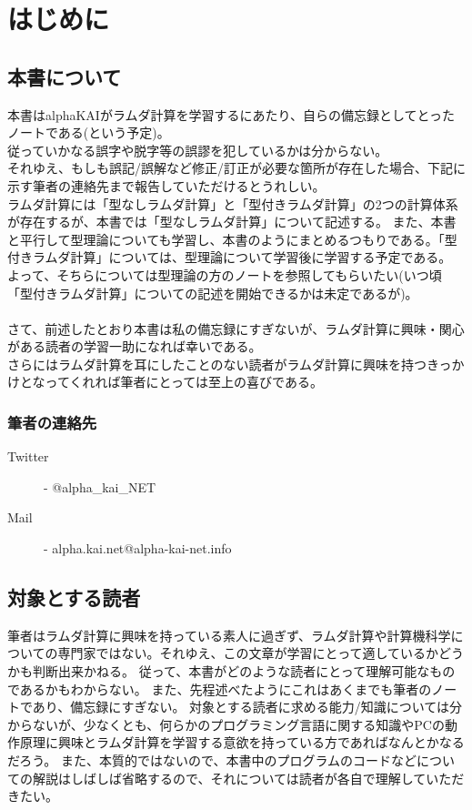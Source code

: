 \chapter{はじめに}{
	\section{本書について}{
		本書はalphaKAIがラムダ計算を学習するにあたり、自らの備忘録としてとったノートである(という予定)。 \\
		従っていかなる誤字や脱字等の誤謬を犯しているかは分からない。 \\
		それゆえ、もしも誤記/誤解など修正/訂正が必要な箇所が存在した場合、下記に示す筆者の連絡先まで報告していただけるとうれしい。 \\
		ラムダ計算には「型なしラムダ計算」と「型付きラムダ計算」の2つの計算体系が存在するが、本書では「型なしラムダ計算」について記述する。
		また、本書と平行して型理論についても学習し、本書のようにまとめるつもりである。「型付きラムダ計算」については、型理論について学習後に学習する予定である。
		よって、そちらについては型理論の方のノートを参照してもらいたい(いつ頃「型付きラムダ計算」についての記述を開始できるかは未定であるが)。\\
		\\
		さて、前述したとおり本書は私の備忘録にすぎないが、ラムダ計算に興味・関心がある読者の学習一助になれば幸いである。\\
		さらにはラムダ計算を耳にしたことのない読者がラムダ計算に興味を持つきっかけとなってくれれば筆者にとっては至上の喜びである。

		\subsection{筆者の連絡先}{
			\begin{description}
				\item[Twitter] - @alpha\_kai\_NET
				\item[Mail] - alpha.kai.net@alpha-kai-net.info
			\end{description}
		}
	}

	\section{対象とする読者}{
		筆者はラムダ計算に興味を持っている素人に過ぎず、ラムダ計算や計算機科学についての専門家ではない。それゆえ、この文章が学習にとって適しているかどうかも判断出来かねる。
		従って、本書がどのような読者にとって理解可能なものであるかもわからない。
		また、先程述べたようにこれはあくまでも筆者のノートであり、備忘録にすぎない。
		対象とする読者に求める能力/知識については分からないが、少なくとも、何らかのプログラミング言語に関する知識やPCの動作原理に興味とラムダ計算を学習する意欲を持っている方であればなんとかなるだろう。
		また、本質的ではないので、本書中のプログラムのコードなどについての解説はしばしば省略するので、それについては読者が各自で理解していただきたい。
	}

}
